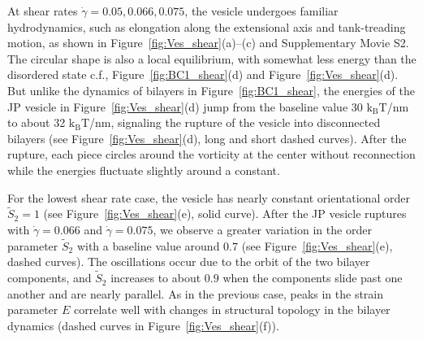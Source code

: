 \documentclass[prb,preprint,showpacs,preprintnumbers,amsmath,amssymb,longbibliography]{revtex4-1}
\begin{document}
At shear rates $\dot\gamma=0.05, 0.066, 0.075$, the vesicle undergoes
familiar hydrodynamics, such as elongation along the extensional axis
and tank-treading motion, as shown in
Figure~\ref{fig:Ves_shear}(a)--(c)
and Supplementary Movie S2.
%
The circular shape is also a local equilibrium, with somewhat less
energy than the disordered state c.f., Figure~\ref{fig:BC1_shear}(d) and
Figure~\ref{fig:Ves_shear}(d). But unlike the dynamics of bilayers in
Figure~\ref{fig:BC1_shear}, the energies of the JP vesicle in
Figure~\ref{fig:Ves_shear}(d) jump from the baseline value 30
$\mathrm{k_BT}$/nm to about 32 $\mathrm{k_BT}$/nm, signaling the rupture
of the vesicle into disconnected bilayers (see
Figure~\ref{fig:Ves_shear}(d), long and short dashed curves).  After the
rupture, each piece circles around the vorticity at the center without
reconnection while the energies fluctuate slightly around a constant.

For the lowest shear rate case, the vesicle has nearly constant
orientational order $\tilde S_2 = 1$ (see Figure~\ref{fig:Ves_shear}(e),
solid curve). After the JP vesicle ruptures with $\dot\gamma= 0.066$ and
$\dot \gamma= 0.075$, we observe a greater variation in the order
parameter $\tilde{S}_2$ with a baseline value around $0.7$ (see
Figure~\ref{fig:Ves_shear}(e), dashed curves). The oscillations occur
due to the orbit of the two bilayer components, and $\tilde{S}_2$
increases to about $0.9$ when the components slide past one another and
are nearly parallel.
%
As in the previous case, peaks in the strain parameter $E$ correlate
well with changes in structural topology in the bilayer dynamics (dashed
curves in Figure~\ref{fig:Ves_shear}(f)).
\end{document}
